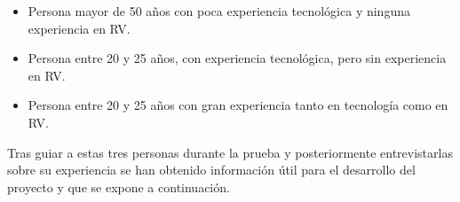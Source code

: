 \begin{itemize}
    \item{Persona mayor de 50 años con poca experiencia tecnológica y ninguna experiencia en RV.}
    \item{Persona entre 20 y 25 años, con experiencia tecnológica, pero sin experiencia en RV.}
    \item{Persona entre 20 y 25 años con gran experiencia tanto en tecnología como en RV.}
\end{itemize}




Tras guiar a estas tres personas durante la prueba y posteriormente entrevistarlas sobre su experiencia se han obtenido información útil para el desarrollo del proyecto y que se expone a continuación.

\begin{itemize}


\end{itemize}
